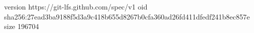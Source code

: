 version https://git-lfs.github.com/spec/v1
oid sha256:27ead3ba9188f5d3a9c418b655d8267b0cfa360ad26fd411dfedf241b8ec857e
size 196704

